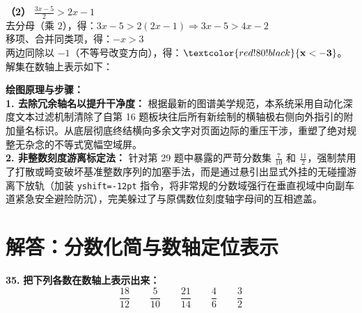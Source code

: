\vspace{0.4cm}
\textbf{（2）} $\frac{3x-5}{2} > 2x - 1$ \\
去分母（乘 $2$），得：$3x - 5 > 2(2x - 1) \Rightarrow 3x - 5 > 4x - 2$ \\
移项、合并同类项，得：$-x > 3$ \\
两边同除以 $-1$（不等号改变方向），得：$\textcolor{red!80!black}{\mathbf{x < -3}}$。\\
解集在数轴上表示如下：
\begin{center}
\end{center}

\vspace{0.4cm}
{\small\color{blue!70!black}
\textbf{绘图原理与步骤：}\\
\textbf{1. 去除冗余轴名以提升干净度：} 根据最新的图谱美学规范，本系统采用自动化深度文本过滤机制清除了自第 16 题板块往后所有新绘制的横轴极右侧向外指引的附加量名标识。从底层彻底终结横向多余文字对页面边际的重压干涉，重塑了绝对规整无杂念的不等式宽幅空域屏。\\
\textbf{2. 非整数刻度游离标定法：} 针对第 29 题中暴露的严苛分数集 $\frac{7}{10}$ 和 $\frac{11}{2}$，强制禁用了打散或畸变破坏基准整数序列的加塞手法，而是通过悬引出显式外挂的无碰撞游离下放轨（加装 \texttt{yshift=-12pt} 指令，将非常规的分数域强行在垂直视域中向副车道紧急安全避险防沉），完美躲过了与原偶数位刻度轴字母间的互相遮盖。
}

\newpage



\section{解答：分数化简与数轴定位表示}

\vspace{0.6cm}

\textbf{\LARGE 35.} \textbf{把下列各数在数轴上表示出来：}
\[
\frac{18}{12} \qquad \frac{5}{10} \qquad \frac{21}{14} \qquad \frac{4}{6} \qquad \frac{3}{2}
\]

